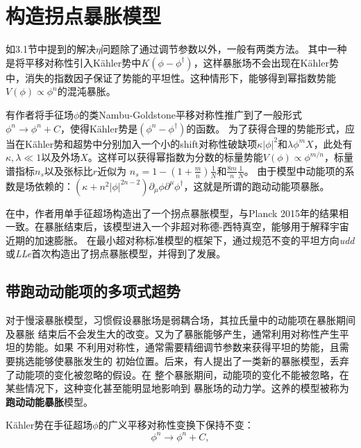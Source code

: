 \section{构造拐点暴胀模型}
如3.1节中提到的解决$\eta$问题\citep{stewart1995inflation,linde1994hybrid,linde1997hybrid,panagiotakopoulos1997hybrid}除了通过调节参数以外，一般有两类方法。
其中一种是将平移对称性引入K\"ahler势中$K(\phi-\phi^\dagger)$，这样暴胀场不会出现在K\"ahler势中，消失的指数因子保证了势能的平坦性。这种情形下，能够得到幂指数势能$V(\phi)\propto
\phi^n$的混沌暴胀。

有作者\citep{takahashi2010linear,nakayama2010running,kasuya2014flat}将手征场$\phi$的类Nambu-Goldstone平移对称性推广到了一般形式$\phi^n\rightarrow
\phi^n+C$，使得K\"ahler势是$\left(\phi^n-\phi^\dagger\right)$的函数。
为了获得合理的势能形式，应当在K\"{a}hler势和超势中分别加入一个小的shift对称性破缺项$\kappa|\phi|^2$和$\lambda\phi^m
X$，此处有$\kappa,\lambda\ll
1$以及外场$X$。这样可以获得幂指数为分数的标量势能$V(\phi)\propto
\phi^{m/n}$，标量谱指标$n_s$以及张标比$r$近似为
$n_s=1-(1+\frac{m}{n})\frac{1}{N}$和$\frac{8m}{n}\frac{1}{N}$\citep{nakayama2010running}。
由于模型中动能项的系数是场依赖的：$(\kappa+n^2|\phi|^{2n-2})\partial_{\mu}\phi\partial^{\mu}\phi^{\dag}$，这就是所谓的跑动动能项暴胀。


在\citep{gao2015inflection}中，作者用单手征超场构造出了一个拐点暴胀模型，与Planck
2015年的结果相一致。在暴胀结束后，该模型进入一个非超对称德-西特真空，能够用于解释宇宙近期的加速膨胀。
在最小超对称标准模型的框架下，通过规范不变的平坦方向\textit{udd}或\textit{LLe}首次构造出了拐点暴胀模型\citep{allahverdi2006gauge}，并得到了发展\citep{allahverdi2007term,enqvist2010inflection,hotchkiss2012observable,chatterjee2015bound}。


\subsection{带跑动动能项的多项式超势}
对于慢滚暴胀模型，习惯假设暴胀场是弱耦合场，其拉氏量中的动能项在暴胀期间及暴胀
结束后不会发生大的改变。又为了暴胀能够产生，通常利用对称性产生平坦的势能。如果
不利用对称性，通常需要精细调节参数来获得平坦的势能，且需要挑选能够使暴胀发生的
初始位置。后来，有人提出了一类新的暴胀模型，丢弃了动能项的变化被忽略的假设。在
整个暴胀期间，动能项的变化不能被忽略，在某些情况下，这种变化甚至能明显地影响到
暴胀场的动力学。这养的模型被称为\textbf{跑动动能暴胀}模型。


K\"ahler势在手征超场$\phi$的广义平移对称性变换下保持不变：
\begin{equation}
    \phi^n \rightarrow \phi^n + C,
\end{equation}

